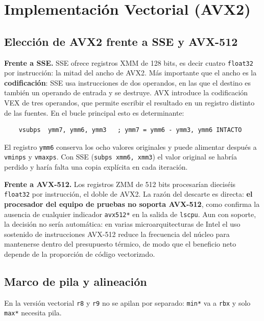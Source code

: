 \documentclass[journal]{IEEEtran}
\begin{document}
\section{Implementación Vectorial (AVX2)}
\label{sec:vectorial}

\subsection{Elección de AVX2 frente a SSE y AVX-512}
\label{sec:eleccion}

\textbf{Frente a SSE.} SSE ofrece registros XMM de 128 bits, es decir
cuatro \texttt{float32} por instrucción: la mitad del ancho de AVX2.
Más importante que el ancho es la \textbf{codificación}: SSE usa
instrucciones de dos operandos, en las que el destino es también un
operando de entrada y se destruye. AVX introduce la codificación VEX de
tres operandos, que permite escribir el resultado en un registro distinto
de las fuentes. En el bucle principal esto es determinante:

\begin{lstlisting}
    vsubps  ymm7, ymm6, ymm3   ; ymm7 = ymm6 - ymm3, ymm6 INTACTO
\end{lstlisting}

El registro \texttt{ymm6} conserva los ocho valores originales y puede
alimentar después a \texttt{vminps} y \texttt{vmaxps}. Con SSE
(\texttt{subps xmm6, xmm3}) el valor original se habría perdido y
haría falta una copia explícita en cada iteración.

\textbf{Frente a AVX-512.} Los registros ZMM de 512 bits procesarían
dieciséis \texttt{float32} por instrucción, el doble de AVX2. La
razón del descarte es directa: \textbf{el procesador del equipo de
pruebas no soporta AVX-512}, como confirma la ausencia de cualquier
indicador \texttt{avx512*} en la salida de \texttt{lscpu}. Aun con
soporte, la decisión no sería automática: en varias
microarquitecturas de Intel el uso sostenido de instrucciones AVX-512
reduce la frecuencia del núcleo para mantenerse dentro del presupuesto
térmico, de modo que el beneficio neto depende de la proporción de
código vectorizado.

\subsection{Marco de pila y alineación}

En la versión vectorial \texttt{r8} y \texttt{r9} no se apilan por
separado: \texttt{min*} va a \texttt{rbx} y solo \texttt{max*} necesita
pila.
\end{document}
